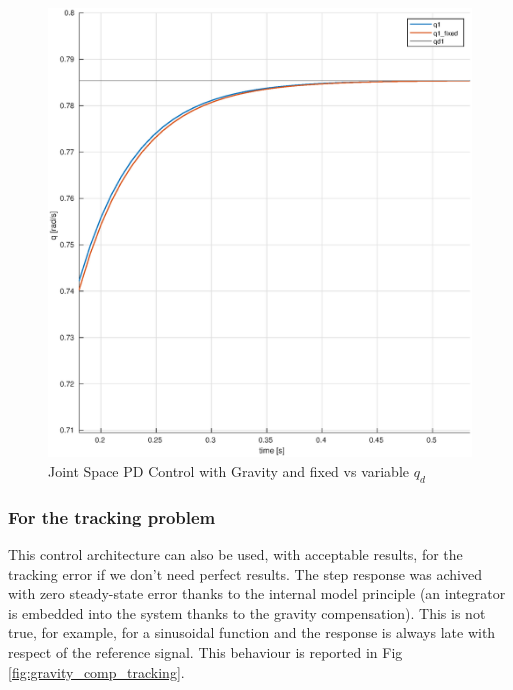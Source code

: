 \documentclass[a4paper,12pt]{article}
\begin{document}
\begin{figure}[H]
    \begin{center}
        \includegraphics[scale=0.4]{images/gravity_comp_fixed.eps}
    \end{center}
    \caption{Joint Space PD Control with Gravity and fixed vs variable $q_d$}
    \label{fig:gravity_comp_fixed}
\end{figure}

\subsubsection{For the tracking problem}

This control architecture can also be used, with acceptable results, for the tracking error if we don't need perfect results. The step response was achived with zero steady-state error thanks to the internal model principle (an integrator is embedded into the system thanks to the gravity compensation). This is not true, for example, for a sinusoidal function and the response is always late with respect of the reference signal. This behaviour is reported in Fig \ref{fig:gravity_comp_tracking}.
\end{document}
